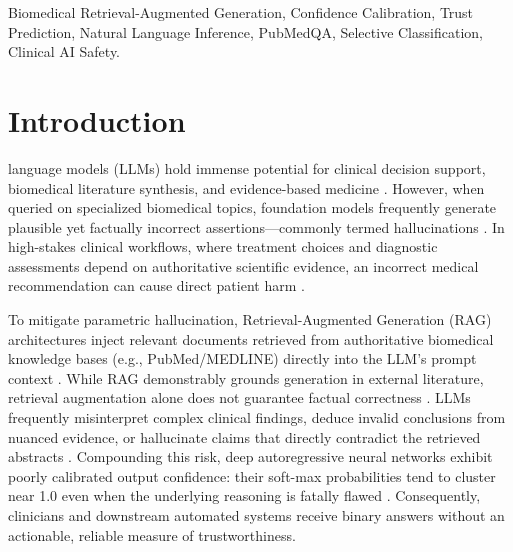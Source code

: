 \documentclass[journal,10pt]{IEEEtran}
\begin{document}
\begin{IEEEkeywords}
Biomedical Retrieval-Augmented Generation, Confidence Calibration, Trust Prediction, Natural Language Inference, PubMedQA, Selective Classification, Clinical AI Safety.
\end{IEEEkeywords}

\section{Introduction}
 language models (LLMs) hold immense potential for clinical decision support, biomedical literature synthesis, and evidence-based medicine \cite{thirunavukarasu2023large, singhal2023large}. However, when queried on specialized biomedical topics, foundation models frequently generate plausible yet factually incorrect assertions---commonly termed hallucinations \cite{ji2023survey, alkaissi2023artificial}. In high-stakes clinical workflows, where treatment choices and diagnostic assessments depend on authoritative scientific evidence, an incorrect medical recommendation can cause direct patient harm \cite{rajpurkar2022ai}.

To mitigate parametric hallucination, Retrieval-Augmented Generation (RAG) architectures inject relevant documents retrieved from authoritative biomedical knowledge bases (e.g., PubMed/MEDLINE) directly into the LLM's prompt context \cite{lewis2020retrieval, borgeaud2022improving}. While RAG demonstrably grounds generation in external literature, retrieval augmentation alone does not guarantee factual correctness \cite{kandpal2023large}. LLMs frequently misinterpret complex clinical findings, deduce invalid conclusions from nuanced evidence, or hallucinate claims that directly contradict the retrieved abstracts \cite{shi2023when, yoran2024making}. Compounding this risk, deep autoregressive neural networks exhibit poorly calibrated output confidence: their soft-max probabilities tend to cluster near 1.0 even when the underlying reasoning is fatally flawed \cite{guo2017calibration, desai2020calibration}. Consequently, clinicians and downstream automated systems receive binary answers without an actionable, reliable measure of trustworthiness.
\end{document}
